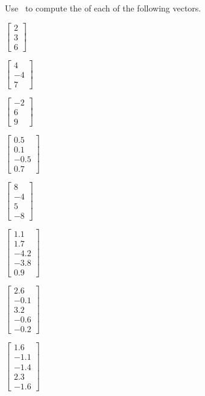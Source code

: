 \begin{exercise}  
Use \script\ to compute the  of each of the following vectors.
\begin{Parts}[4]
\item \(\begin{bmatrix} 2\\3\\6 \end{bmatrix}\)
\item \(\begin{bmatrix} 4\\-4\\7 \end{bmatrix}\)
\begin{OmitV1}
\item \(\begin{bmatrix} -2\\6\\9 \end{bmatrix}\)
\item \(\begin{bmatrix} 0.5\\0.1\\-0.5\\0.7 \end{bmatrix}\)
\item \(\begin{bmatrix} 8\\-4\\5\\-8 \end{bmatrix}\)
\item \(\begin{bmatrix} 1.1\\1.7\\-4.2\\-3.8\\0.9 \end{bmatrix}\)
\end{OmitV1}
\item \(\begin{bmatrix} 2.6\\-0.1\\3.2\\-0.6\\-0.2 \end{bmatrix}\)
\item \(\begin{bmatrix} 1.6\\-1.1\\-1.4\\2.3\\-1.6 \end{bmatrix}\)
\end{Parts}
\end{exercise}



